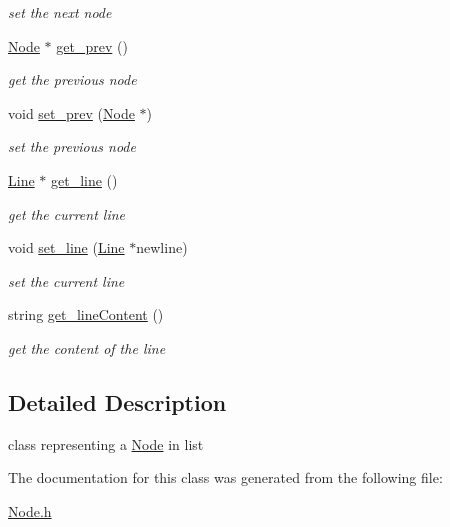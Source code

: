 \begin{DoxyCompactItemize}
\begin{DoxyCompactList}\small\item\em set the next node \end{DoxyCompactList}\item 
\hypertarget{classNode_ae1f2f87a25c263e385f435059516d0df}{\hyperlink{classNode}{\-Node} $\ast$ \hyperlink{classNode_ae1f2f87a25c263e385f435059516d0df}{get\-\_\-prev} ()}\label{classNode_ae1f2f87a25c263e385f435059516d0df}

\begin{DoxyCompactList}\small\item\em get the previous node \end{DoxyCompactList}\item 
\hypertarget{classNode_ae956250c849d3886566229dc7264e797}{void \hyperlink{classNode_ae956250c849d3886566229dc7264e797}{set\-\_\-prev} (\hyperlink{classNode}{\-Node} $\ast$)}\label{classNode_ae956250c849d3886566229dc7264e797}

\begin{DoxyCompactList}\small\item\em set the previous node \end{DoxyCompactList}\item 
\hypertarget{classNode_a148767567f75e6d3e5e8f8ff9e438336}{\hyperlink{classLine}{\-Line} $\ast$ \hyperlink{classNode_a148767567f75e6d3e5e8f8ff9e438336}{get\-\_\-line} ()}\label{classNode_a148767567f75e6d3e5e8f8ff9e438336}

\begin{DoxyCompactList}\small\item\em get the current line \end{DoxyCompactList}\item 
\hypertarget{classNode_acb0fcb0970c2e2efd9ec90133ea8d236}{void \hyperlink{classNode_acb0fcb0970c2e2efd9ec90133ea8d236}{set\-\_\-line} (\hyperlink{classLine}{\-Line} $\ast$newline)}\label{classNode_acb0fcb0970c2e2efd9ec90133ea8d236}

\begin{DoxyCompactList}\small\item\em set the current line \end{DoxyCompactList}\item 
\hypertarget{classNode_a97c6b9e99919926b82b33444883754f1}{string \hyperlink{classNode_a97c6b9e99919926b82b33444883754f1}{get\-\_\-line\-Content} ()}\label{classNode_a97c6b9e99919926b82b33444883754f1}

\begin{DoxyCompactList}\small\item\em get the content of the line \end{DoxyCompactList}\end{DoxyCompactItemize}


\subsection{\-Detailed \-Description}
class representing a \hyperlink{classNode}{\-Node} in list 

\-The documentation for this class was generated from the following file\-:\begin{DoxyCompactItemize}
\item 
\hyperlink{Node_8h}{\-Node.\-h}\end{DoxyCompactItemize}
